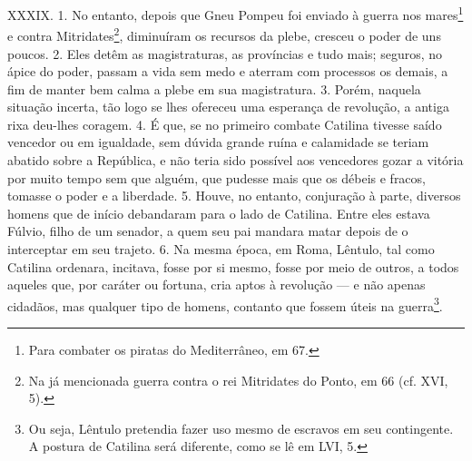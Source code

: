 XXXIX. 1. No entanto, depois que Gneu Pompeu foi enviado à guerra nos
mares\footnote{Para combater os piratas do Mediterrâneo, em 67.} e contra
Mitridates\footnote{Na já mencionada guerra contra o rei Mitridates do Ponto,
em 66 (cf. XVI, 5).}, diminuíram os recursos da plebe, cresceu o poder de uns
poucos. 2. Eles detêm as magistraturas, as províncias e tudo mais; seguros, no
ápice do poder, passam a vida sem medo e aterram com processos os demais, a fim
de manter bem calma a plebe em sua magistratura. 3. Porém, naquela situação
incerta, tão logo se lhes ofereceu uma esperança de revolução, a antiga rixa
deu-lhes coragem. 4. É que, se no primeiro combate Catilina tivesse saído vencedor ou
em igualdade, sem dúvida grande ruína e calamidade se teriam abatido sobre a
República, e não teria sido possível aos vencedores gozar a vitória por muito tempo
sem que alguém, que pudesse mais que os débeis e fracos, tomasse o poder e a
liberdade. 5. Houve, no entanto, conjuração à parte, diversos homens que de
início debandaram para o lado de Catilina. Entre eles estava Fúlvio, filho de
um senador, a quem seu pai mandara matar depois de o interceptar em seu
trajeto. 6. Na mesma época, em Roma, Lêntulo, tal como Catilina ordenara,
incitava, fosse por si mesmo, fosse por meio de outros, a todos aqueles que,
por caráter ou fortuna, cria aptos à revolução --- e não apenas cidadãos, mas
qualquer tipo de homens, contanto que fossem úteis na guerra\footnote{Ou seja,
Lêntulo pretendia fazer uso mesmo de escravos em seu contingente. A postura de
Catilina será diferente, como se lê em LVI, 5.}. 

